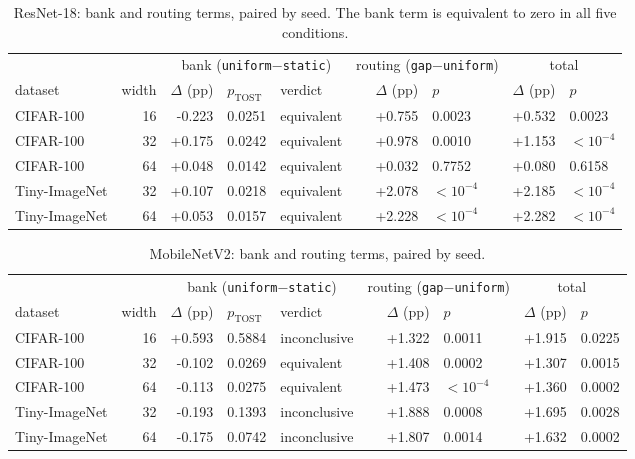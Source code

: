 \documentclass[10pt,a4paper]{article}
\begin{document}
\begin{table}[!htbp]\centering\small
\caption{ResNet-18: bank and routing terms, paired by seed. The bank
term is equivalent to zero in all five conditions.}
\label{tab:decomp}
\begin{tabular}{l r rll rl rl}
\toprule
& & \multicolumn{3}{c}{bank (\texttt{uniform}$-$\texttt{static})}
& \multicolumn{2}{c}{routing (\texttt{gap}$-$\texttt{uniform})}
& \multicolumn{2}{c}{total} \\
\cmidrule(lr){3-5}\cmidrule(lr){6-7}\cmidrule(lr){8-9}
dataset & width & $\Delta$ (pp) & $p_{\text{TOST}}$ & verdict & $\Delta$ (pp) & $p$ & $\Delta$ (pp) & $p$ \\
\midrule
CIFAR-100 & 16 & -0.223 & 0.0251 & equivalent & +0.755 & 0.0023 & +0.532 & 0.0023 \\
CIFAR-100 & 32 & +0.175 & 0.0242 & equivalent & +0.978 & 0.0010 & +1.153 & $<10^{-4}$ \\
CIFAR-100 & 64 & +0.048 & 0.0142 & equivalent & +0.032 & 0.7752 & +0.080 & 0.6158 \\
Tiny-ImageNet & 32 & +0.107 & 0.0218 & equivalent & +2.078 & $<10^{-4}$ & +2.185 & $<10^{-4}$ \\
Tiny-ImageNet & 64 & +0.053 & 0.0157 & equivalent & +2.228 & $<10^{-4}$ & +2.282 & $<10^{-4}$ \\
\bottomrule
\end{tabular}
\end{table}

\begin{table}[!htbp]\centering\small
\caption{MobileNetV2: bank and routing terms, paired by seed.}
\label{tab:mbdecomp}
\begin{tabular}{l r rll rl rl}
\toprule
& & \multicolumn{3}{c}{bank (\texttt{uniform}$-$\texttt{static})}
& \multicolumn{2}{c}{routing (\texttt{gap}$-$\texttt{uniform})}
& \multicolumn{2}{c}{total} \\
\cmidrule(lr){3-5}\cmidrule(lr){6-7}\cmidrule(lr){8-9}
dataset & width & $\Delta$ (pp) & $p_{\text{TOST}}$ & verdict & $\Delta$ (pp) & $p$ & $\Delta$ (pp) & $p$ \\
\midrule
CIFAR-100 & 16 & +0.593 & 0.5884 & inconclusive & +1.322 & 0.0011 & +1.915 & 0.0225 \\
CIFAR-100 & 32 & -0.102 & 0.0269 & equivalent & +1.408 & 0.0002 & +1.307 & 0.0015 \\
CIFAR-100 & 64 & -0.113 & 0.0275 & equivalent & +1.473 & $<10^{-4}$ & +1.360 & 0.0002 \\
Tiny-ImageNet & 32 & -0.193 & 0.1393 & inconclusive & +1.888 & 0.0008 & +1.695 & 0.0028 \\
Tiny-ImageNet & 64 & -0.175 & 0.0742 & inconclusive & +1.807 & 0.0014 & +1.632 & 0.0002 \\
\bottomrule
\end{tabular}
\end{table}
\end{document}
